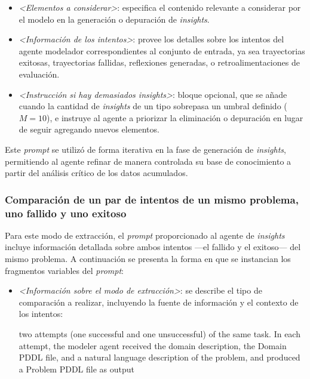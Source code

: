 \begin{anexes}
\begin{itemize}
    \item \textit{<Elementos a considerar>}: especifica el contenido relevante a considerar por el modelo en la generación o depuración de \textit{insights}.

    \item \textit{<Información de los intentos>}: provee los detalles sobre los intentos del agente modelador correspondientes al conjunto de entrada, ya sea trayectorias exitosas, trayectorias fallidas, reflexiones generadas, o retroalimentaciones de evaluación.

    \item \textit{<Instrucción si hay demasiados insights>}: bloque opcional, que se añade cuando la cantidad de \textit{insights} de un tipo sobrepasa un umbral definido ($M = 10$), e instruye al agente a priorizar la eliminación o depuración en lugar de seguir agregando nuevos elementos.
\end{itemize}

Este \textit{prompt} se utilizó de forma iterativa en la fase de generación de \textit{insights}, permitiendo al agente refinar de manera controlada su base de conocimiento a partir del análisis crítico de los datos acumulados.

\subsubsection{Comparación de un par de intentos de un mismo problema, uno fallido y uno exitoso}

Para este modo de extracción, el \textit{prompt} proporcionado al agente de \textit{insights} incluye información detallada sobre ambos intentos —el fallido y el exitoso— del mismo problema. A continuación se presenta la forma en que se instancian los fragmentos variables del \textit{prompt}:

\begin{itemize}
    \item \textit{<Información sobre el modo de extracción>}: se describe el tipo de comparación a realizar, incluyendo la fuente de información y el contexto de los intentos:
\begin{tcolorbox}[colback=gray!10!white, colframe=black, title=Modo de extracción de \textit{insights}, fonttitle=\bfseries, breakable]
two attempts (one successful and one unsuccessful) of the same task. In each attempt, the modeler agent received the domain description, the Domain PDDL file, and a natural language description of the problem, and produced a Problem PDDL file as output
\end{tcolorbox}


\end{itemize}
\end{anexes}

